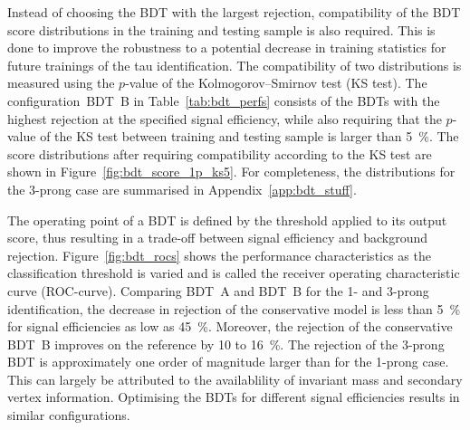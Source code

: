 Instead of choosing the BDT with the largest rejection, compatibility of the BDT
score distributions in the training and testing sample is also required. This is
done to improve the robustness to a potential decrease in training statistics
for future trainings of the tau identification. The compatibility of two
distributions is measured using the $p$-value of the Kolmogorov--Smirnov test
(KS test). The configuration~\mbox{BDT B} in Table~\ref{tab:bdt_perfs} consists
of the BDTs with the highest rejection at the specified signal efficiency, while
also requiring that the $p$-value of the KS test between training and testing
sample is larger than \SI{5}{\percent}. The score distributions after requiring
compatibility according to the KS test are shown in
Figure~\ref{fig:bdt_score_1p_ks5}. For completeness, the distributions for the
3-prong case are summarised in Appendix~\ref{app:bdt_stuff}.

The operating point of a BDT is defined by the threshold applied to its output
score, thus resulting in a trade-off between signal efficiency and background
rejection. Figure~\ref{fig:bdt_rocs} shows the performance characteristics as
the classification threshold is varied and is called the receiver operating
characteristic curve (ROC-curve). Comparing \mbox{BDT A} and \mbox{BDT B} for
the 1- and 3-prong identification, the decrease in rejection of the conservative
model is less than \SI{5}{\percent} for signal efficiencies as low as
\SI{45}{\percent}. Moreover, the rejection of the conservative \mbox{BDT B}
improves on the reference by \num{10} to \SI{16}{\percent}. The rejection of the
3-prong BDT is approximately one order of magnitude larger than for the 1-prong
case. This can largely be attributed to the availablility of invariant mass and
secondary vertex information. Optimising the BDTs for different signal
efficiencies results in similar configurations.

